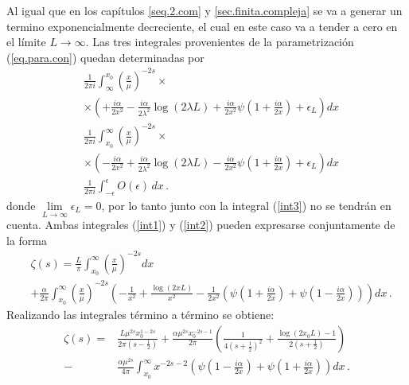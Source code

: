 Al igual que en los capítulos \ref{seq.2.com} y  \ref{sec.finita.compleja} se va a generar un termino exponencialmente decreciente, el cual en este caso va a tender a cero en el límite $L \rightarrow \infty$. Las tres integrales provenientes de la parametrización (\ref{eq.para.con}) quedan determinadas por 
\begin{align}
&
\nonumber
	\frac{ 1 }{2 \pi i}  
	\int _{\infty} ^{x _0} 
	\left( \frac{x}{\mu} \right) ^{-2s} \times
\\
&
	\times
	\left( +
	\frac{i \alpha}{2 x^2} - 
	\frac{i \alpha }{2 \lambda ^2} \log ( 2 \lambda L ) +
	\frac{i \alpha}{2 x ^2 } \psi \left( 1 + \frac{i \alpha}{2 x} \right) +
	\epsilon _L
	\right)
	d x
\label{int1}	
\\
\nonumber
&
	\frac{ 1 }{2 \pi i}  
	\int _{x _0} ^{\infty} 
	\left( \frac{x}{\mu} \right) ^{-2s}
	\times
\\
&
	\times	
	\left( -
	\frac{i \alpha}{2 x^2} + 
	\frac{i \alpha }{2 \lambda ^2} \log ( 2 \lambda L ) -
	\frac{i \alpha}{2 x ^2 } \psi \left( 1 + \frac{i \alpha}{2 x} \right) +
	\epsilon _L
	\right)
	d x
\label{int2}	
\\
&
	\frac{ 1 }{2 \pi i}	
	\int _{- \epsilon} ^{\epsilon}
	O (\epsilon) \, dx
\label{int3}
\, .	
\end{align}
donde $\lim \limits _{L \rightarrow \infty} \epsilon _L = 0$, por lo tanto junto con la integral (\ref{int3}) no se tendrán en cuenta. Ambas integrales (\ref{int1}) y (\ref{int2}) pueden expresarse conjuntamente de la forma
\begin{align}
&
	\zeta (s)=
	\frac{L }{\pi}
	\int _ {x_0} ^{\infty} \left( \frac{x}{\mu} \right) ^{-2s} dx
\\	 
& 
\nonumber
	+
	\frac{\alpha }{2 \pi } \int _{x_0} ^{\infty} 
	\left( \frac{x}{\mu} \right) ^{-2s}
	\left(-
	\frac{1}{ x ^2} +
	\frac{\log \left( 2 x L \right) }{x ^2}  -
	\frac{1}{ 2 x ^2 } 
	\left(
	\psi \left( 1 + \frac{i \alpha}{2  x} \right) + \psi \left( 1 - \frac{i \alpha}{2 x} \right) 
	\right)
	\right)
	d x
	\, .
\end{align}
Realizando las integrales término a término se obtiene:
\begin{align}
	\zeta (s)=
&
\nonumber
	\frac{L  \mu ^{2s} x _0 ^{1-2s} }{2 \pi \left( s- \frac{1}{2} \right)}  + 
	\frac{\alpha \mu ^{2s} x _{0} ^{-2s-1} }{2 \pi} 
	\left( 
	\frac{1}{4 \left(s+ \frac{1}{2} \right) ^2} +
	\frac{\log(2 x _0 L) -1 }{2 \left(s+\frac{1}{2} \right)} 
	\right) 
\\
-
&	
	\frac{\alpha \mu ^{2s} }{4 \pi}
	\int _{x_0} ^{\infty} 
	x ^{-2s-2}
	\left(
	\psi \left( 1 - \frac{i \alpha}{2 x} \right) +
	\psi \left( 1 + \frac{i \alpha}{2 x} \right)
	\right)
	dx
\, .
\end{align}
